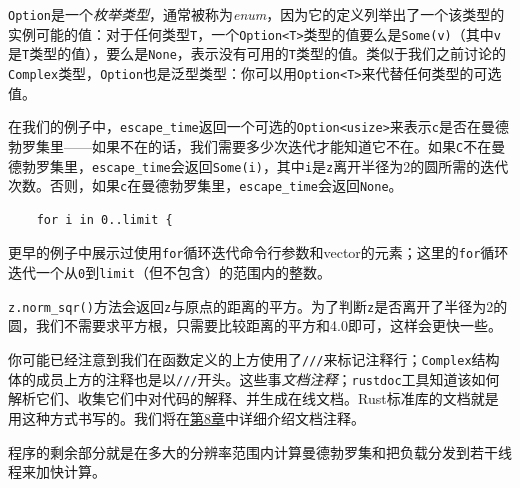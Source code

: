 \texttt{Option}是一个\emph{枚举类型}，通常被称为\emph{enum}，因为它的定义列举出了一个该类型的实例可能的值：对于任何类型\texttt{T}，一个\texttt{Option<T>}类型的值要么是\texttt{Some(v)}（其中\texttt{v}是\texttt{T}类型的值），要么是\texttt{None}，表示没有可用的\texttt{T}类型的值。类似于我们之前讨论的\texttt{Complex}类型，\texttt{Option}也是泛型类型：你可以用\texttt{Option<T>}来代替任何类型的可选值。

在我们的例子中，\texttt{escape\_time}返回一个可选的\texttt{Option<usize>}来表示\texttt{c}是否在曼德勃罗集里——如果不在的话，我们需要多少次迭代才能知道它不在。如果\texttt{C}不在曼德勃罗集里，\texttt{escape\_time}会返回\texttt{Some(i)}，其中\texttt{i}是\texttt{z}离开半径为2的圆所需的迭代次数。否则，如果\texttt{c}在曼德勃罗集里，\texttt{escape\_time}会返回\texttt{None}。
\begin{verbatim}
    for i in 0..limit {
\end{verbatim}

更早的例子中展示过使用\texttt{for}循环迭代命令行参数和vector的元素；这里的\texttt{for}循环迭代一个从\texttt{0}到\texttt{limit}（但不包含）的范围内的整数。

\texttt{z.norm\_sqr()}方法会返回\texttt{z}与原点的距离的平方。为了判断\texttt{z}是否离开了半径为2的圆，我们不需要求平方根，只需要比较距离的平方和4.0即可，这样会更快一些。

你可能已经注意到我们在函数定义的上方使用了\texttt{///}来标记注释行；\texttt{Complex}结构体的成员上方的注释也是以\texttt{///}开头。这些事\emph{文档注释}；\texttt{rustdoc}工具知道该如何解析它们、收集它们中对代码的解释、并生成在线文档。Rust标准库的文档就是用这种方式书写的。我们将在\hyperref[ch08]{第8章}中详细介绍文档注释。

程序的剩余部分就是在多大的分辨率范围内计算曼德勃罗集和把负载分发到若干线程来加快计算。

